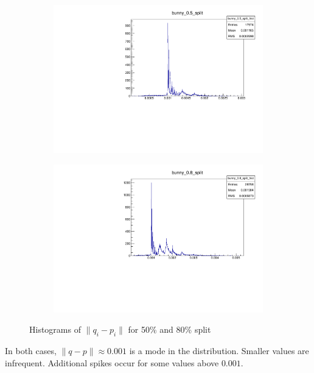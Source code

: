 \begin{figure}[H]
\centering
\begin{subfigure}{.5\textwidth}
\includegraphics[width=\linewidth]{fig/bunny_05_split.pdf}
\end{subfigure}%
\begin{subfigure}{.5\textwidth}
\includegraphics[width=\linewidth]{fig/bunny_08_split.pdf}
\end{subfigure}
\caption{Histograms of $\|q_i - p_i\|$ for 50\% and 80\% split}
\label{fig:bunny_fexp_before}
\end{figure}

In both cases, $\| q - p \| \approx 0.001$ is a mode in the distribution. Smaller values are infrequent. Additional spikes occur for some values above $0.001$. 

